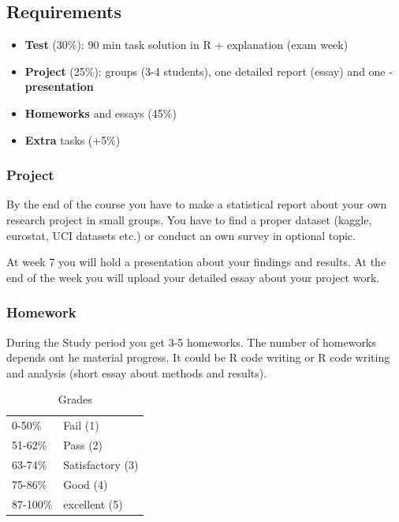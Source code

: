 \documentclass[
]{article}
\begin{document}
\hypertarget{requirements}{%
\subsection{\texorpdfstring{\textbf{Requirements}}{Requirements}}\label{requirements}}

\begin{itemize}
\item
  \textbf{Test} (30\%): 90 min task solution in R + explanation (exam week)
\item
  \textbf{Project} (25\%): groups (3-4 students), one detailed report
  (essay) and one - \textbf{presentation}
\item
  \textbf{Homeworks} and essays (45\%)
\item
  \textbf{Extra} tasks (+5\%)
\end{itemize}

\hypertarget{project}{%
\subsubsection{Project}\label{project}}

By the end of the course you have to make a statistical report about your own research project in small groups. You have to find a proper dataset (kaggle, eurostat, UCI datasets etc.) or conduct an own survey in optional topic.

At week 7 you will hold a presentation about your findings and results. At the end of the week you will upload your detailed essay about your project work.

\hypertarget{homework}{%
\subsubsection{Homework}\label{homework}}

During the Study period you get 3-5 homeworks. The number of homeworks depends ont he material progress. It could be R code writing or R code writing and analysis (short essay about methods and results).

\begin{longtable}[]{@{}ll@{}}
\caption{Grades}\tabularnewline
\toprule
\endhead
0-50\% & Fail (1) \\
51-62\% & Pass (2) \\
63-74\% & Satisfactory (3) \\
75-86\% & Good (4) \\
87-100\% & excellent (5) \\
\bottomrule
\end{longtable}
\end{document}
